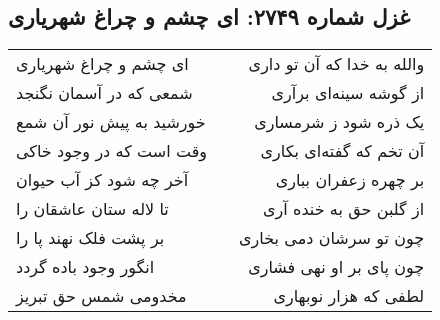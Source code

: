 \begin{center}
\section*{غزل شماره ۲۷۴۹: ای چشم و چراغ شهریاری}
\label{sec:2749}
\begin{longtable}{l p{0.5cm} r}
ای چشم و چراغ شهریاری
&&
والله به خدا که آن تو داری
\\
شمعی که در آسمان نگنجد
&&
از گوشه سینه‌ای برآری
\\
خورشید به پیش نور آن شمع
&&
یک ذره شود ز شرمساری
\\
وقت است که در وجود خاکی
&&
آن تخم که گفته‌ای بکاری
\\
آخر چه شود کز آب حیوان
&&
بر چهره زعفران بباری
\\
تا لاله ستان عاشقان را
&&
از گلبن حق به خنده آری
\\
بر پشت فلک نهند پا را
&&
چون تو سرشان دمی بخاری
\\
انگور وجود باده گردد
&&
چون پای بر او نهی فشاری
\\
مخدومی شمس حق تبریز
&&
لطفی که هزار نوبهاری
\\
\end{longtable}
\end{center}
